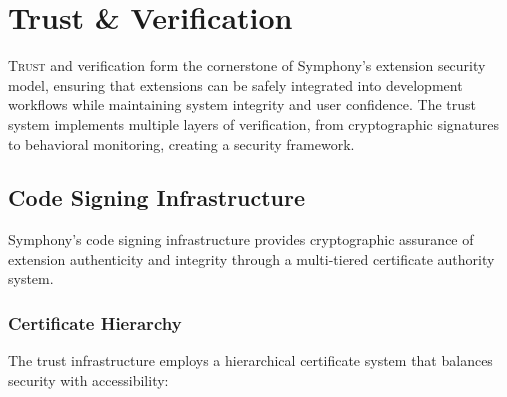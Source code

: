 
\section{Trust \& Verification}
\label{sec:trust-verification}

\lettrine{T}{rust} and verification form the cornerstone of Symphony's extension security model, ensuring that extensions can be safely integrated into development workflows while maintaining system integrity and user confidence. The trust system implements multiple layers of verification, from cryptographic signatures to behavioral monitoring, creating a security framework.

\subsection{Code Signing Infrastructure}
\label{subsec:code-signing-infrastructure}

Symphony's code signing infrastructure provides cryptographic assurance of extension authenticity and integrity through a multi-tiered certificate authority system.

\subsubsection{Certificate Hierarchy}
\label{subsubsec:certificate-hierarchy}

The trust infrastructure employs a hierarchical certificate system that balances security with accessibility:

